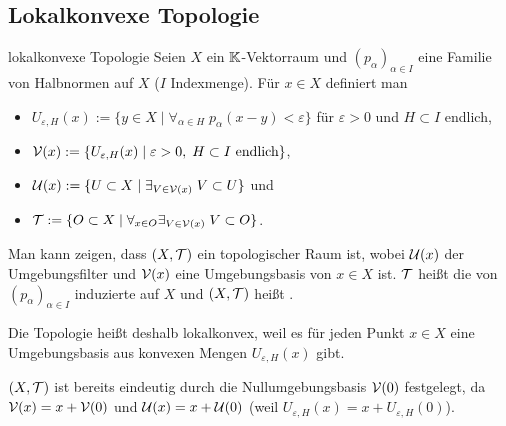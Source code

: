 \pagebreak

\subsection{%
    Lokalkonvexe Topologie%
}

\begin{Def}{lokalkonvexe Topologie}
    Seien $X$ ein $\mathbb{K}$-Vektorraum und $(p_\alpha)_{\alpha \in I}$ eine Familie von
    Halbnormen auf $X$ ($I$ Indexmenge).
    Für $x \in X$ definiert man
    \begin{itemize}
        \item
        $U_{\varepsilon,H}(x) := \{y \in X \;|\; \forall_{\alpha \in H}\;
        p_\alpha(x - y) < \varepsilon\}$
        für $\varepsilon > 0$ und $H \subset I$ endlich,
        
        \item
        $\mathcal{V}(x) := \{U_{\varepsilon,H}(x) \;|\; \varepsilon > 0,\; H \subset I \text{ endlich}\}$,
        
        \item
        $\mathcal{U}(x) := \{U \subset X \;|\; \exists_{V \in \mathcal{V}(x)}\; V \subset U\}$ und
        
        \item
        $\mathcal{T} := \{O \subset X \;|\; \forall_{x \in O} \exists_{V \in \mathcal{V}(x)}\; V \subset O\}$.
    \end{itemize}
    Man kann zeigen, dass $(X, \mathcal{T})$ ein topologischer Raum ist,
    wobei $\mathcal{U}(x)$ der Umgebungsfilter und $\mathcal{V}(x)$ eine Umgebungsbasis von $x \in X$ ist.
    $\mathcal{T}$ heißt die von $(p_\alpha)_{\alpha \in I}$ induzierte 
    auf $X$ und $(X, \mathcal{T})$ heißt .
\end{Def}

\begin{Bem}
    Die Topologie heißt deshalb lokalkonvex, weil es für jeden Punkt $x \in X$ eine
    Umgebungsbasis aus konvexen Mengen $U_{\varepsilon,H}(x)$ gibt.
\end{Bem}

\begin{Bem}
    $(X, \mathcal{T})$ ist bereits eindeutig durch die Nullumgebungsbasis $\mathcal{V}(0)$ festgelegt,
    da $\mathcal{V}(x) = x + \mathcal{V}(0)$ und $\mathcal{U}(x) = x + \mathcal{U}(0)$
    (weil $U_{\varepsilon,H}(x) = x + U_{\varepsilon,H}(0)$).
\end{Bem}

\linie

